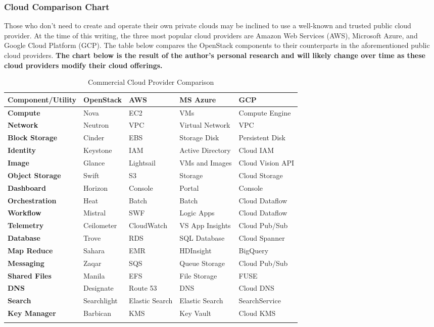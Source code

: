 \subsubsection{Cloud Comparison Chart}
Those who don’t need to create and operate their own private clouds may be
inclined to use a well-known and trusted public cloud provider. At the time of
this writing, the three most popular cloud providers are Amazon Web Services
(AWS), Microsoft Azure, and Google Cloud Platform (GCP). The table below
compares the OpenStack components to their counterparts in the aforementioned
public cloud providers. \textbf{The chart below is the result of the author’s
personal research and will likely change over time as these cloud providers
modify their cloud offerings.}

\begin{longtable}{LLLLL}
\toprule
\textbf{Component/Utility}
&
\textbf{OpenStack}
&
\textbf{AWS}
&
\textbf{MS Azure}
&
\textbf{GCP}
\\ \midrule
\textbf{Compute}
&
Nova
&
EC2
&
VMs
&
Compute Engine
\\ \midrule
\textbf{Network}
&
Neutron
&
VPC
&
Virtual Network
&
VPC
\\ \midrule
\textbf{Block Storage}
&
Cinder
&
EBS
&
Storage Disk
&
Persistent Disk
\\ \midrule
\textbf{Identity}
&
Keystone
&
IAM
&
Active Directory
&
Cloud IAM
\\ \midrule
\textbf{Image}
&
Glance
&
Lightsail
&
VMs and Images
&
Cloud Vision API
\\ \midrule
\textbf{Object Storage}
&
Swift
&
S3
&
Storage
&
Cloud Storage
\\ \midrule
\textbf{Dashboard}
&
Horizon
&
Console
&
Portal
&
Console
\\ \midrule
\textbf{Orchestration}
&
Heat
&
Batch
&
Batch
&
Cloud Dataflow
\\ \midrule
\textbf{Workflow}
&
Mistral
&
SWF
&
Logic Apps
&
Cloud Dataflow
\\ \midrule
\textbf{Telemetry}
&
Ceilometer
&
CloudWatch
&
VS App Insights
&
Cloud Pub/Sub
\\ \midrule
\textbf{Database}
&
Trove
&
RDS
&
SQL Database
&
Cloud Spanner
\\ \midrule
\textbf{Map Reduce}
&
Sahara
&
EMR
&
HDInsight
&
BigQuery
\\ \midrule
\textbf{Messaging}
&
Zaqar
&
SQS
&
Queue Storage
&
Cloud Pub/Sub
\\ \midrule
\textbf{Shared Files}
&
Manila
&
EFS
&
File Storage
&
FUSE
\\ \midrule
\textbf{DNS}
&
Designate
&
Route 53
&
DNS
&
Cloud DNS
\\ \midrule
\textbf{Search}
&
Searchlight
&
Elastic Search
&
Elastic Search
&
SearchService
\\ \midrule
\textbf{Key Manager}
&
Barbican
&
KMS
&
Key Vault
&
Cloud KMS
\\
\bottomrule
\caption{Commercial Cloud Provider Comparison}
\end{longtable}
